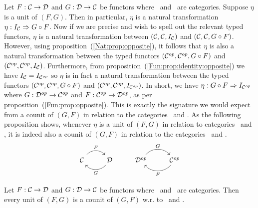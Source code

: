 Let $F:\mbox{$\cal C$}\to\mbox{$\cal D$}$ and $G:\mbox{$\cal D$}\to\mbox{$\cal C$}$ be functors where \Cat\ and \Dat\ 
are categories. Suppose $\eta$ is a unit of $(F,G)$. Then in particular,
$\eta$ is a natural transformation $\eta:I_{\cal C}\Rightarrow G\circ F$.
Now if we are precise and wish to spell out the relevant typed functors,
$\eta$ is a natural transformation between $(\mbox{$\cal C$},\mbox{$\cal C$},I_{\cal C})$ and
$(\mbox{$\cal C$},\mbox{$\cal C$},G\circ F)$. However, using proposition~(\ref{Nat:prop:opposite}),
it follows that $\eta$ is also a natural transformation between the typed
functors $(\mbox{${\cal C}^{op}$},\mbox{${\cal C}^{op}$},G\circ F)$ and $(\mbox{${\cal C}^{op}$},\mbox{${\cal C}^{op}$},I_{\cal C})$. Furthermore,
from proposition~(\ref{Fun:prop:identity:opposite}) we have $I_{\cal C}=
I_{{\cal C}^{op}}$ so $\eta$ is in fact a natural transformation between
the typed functors $(\mbox{${\cal C}^{op}$},\mbox{${\cal C}^{op}$},G\circ F)$ and $(\mbox{${\cal C}^{op}$},\mbox{${\cal C}^{op}$},I_{{\cal C}^{op}})$.
In short, we have $\eta:G\circ F\Rightarrow I_{{\cal C}^{op}}$ where 
$G:\mbox{${\cal D}^{op}$}\to\mbox{${\cal C}^{op}$}$ and $F:\mbox{${\cal C}^{op}$}\to\mbox{${\cal D}^{op}$}$, as per proposition~(\ref{Fun:prop:opposite}).
This is exactly the signature we would expect from a counit of $(G,F)$ in 
relation to the categories \Dop\ and \Cop. As the following proposition shows, 
whenever $\eta$ is a unit of $(F,G)$ in relation to categories \Cat\ and \Dat, 
it is indeed also a counit of $(G,F)$ in relation to the categories 
\Dop\ and \Cop.
    \[
        \begin{tikzcd}
              \Cat \arrow[r, "F", bend left  = 50, ""{name=U, below}]
            & \Dat \arrow[l, "G", bend left = 50, ""{name=D, above}]
            & \Dop \arrow[r, "G", bend left  = 50, ""{name=U, below}]
            & \Cop \arrow[l, "F", bend left  = 50, ""{name=U, below}]
        \end{tikzcd}
    \]
\begin{prop}\label{Adj:prop:unit:opposite}
    Let $F:\mbox{$\cal C$}\to\mbox{$\cal D$}$ and $G:\mbox{$\cal D$}\to\mbox{$\cal C$}$ be functors where \Cat\ and \Dat\ 
    are categories. Then every unit of $(F,G)$ is
    a counit of $(G,F)$ w.r. to \Dop\ and \Cop.
\end{prop}
